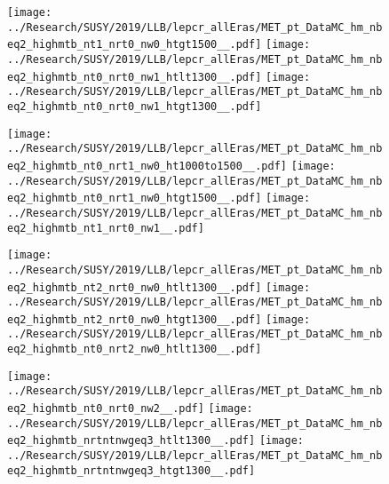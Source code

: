 \begin{figure}[!htb]
  \texttt{[image: ../Research/SUSY/2019/LLB/lepcr\_allEras/MET\_pt\_DataMC\_hm\_nbeq2\_highmtb\_nt1\_nrt0\_nw0\_htgt1500\_\_.pdf]}
\endminipage
{}
  \texttt{[image: ../Research/SUSY/2019/LLB/lepcr\_allEras/MET\_pt\_DataMC\_hm\_nbeq2\_highmtb\_nt0\_nrt0\_nw1\_htlt1300\_\_.pdf]}
\endminipage\hfill
{}
  \texttt{[image: ../Research/SUSY/2019/LLB/lepcr\_allEras/MET\_pt\_DataMC\_hm\_nbeq2\_highmtb\_nt0\_nrt0\_nw1\_htgt1300\_\_.pdf]}
\endminipage\hfill
\end{figure}

\begin{figure}[!htb]
  \texttt{[image: ../Research/SUSY/2019/LLB/lepcr\_allEras/MET\_pt\_DataMC\_hm\_nbeq2\_highmtb\_nt0\_nrt1\_nw0\_ht1000to1500\_\_.pdf]}
\endminipage\hfill
{}
  \texttt{[image: ../Research/SUSY/2019/LLB/lepcr\_allEras/MET\_pt\_DataMC\_hm\_nbeq2\_highmtb\_nt0\_nrt1\_nw0\_htgt1500\_\_.pdf]}
\endminipage\hfill
{}
  \texttt{[image: ../Research/SUSY/2019/LLB/lepcr\_allEras/MET\_pt\_DataMC\_hm\_nbeq2\_highmtb\_nt1\_nrt0\_nw1\_\_.pdf]}
\endminipage
\end{figure}

\begin{figure}[!htb]
  \texttt{[image: ../Research/SUSY/2019/LLB/lepcr\_allEras/MET\_pt\_DataMC\_hm\_nbeq2\_highmtb\_nt2\_nrt0\_nw0\_htlt1300\_\_.pdf]}
\endminipage\hfill
{}
  \texttt{[image: ../Research/SUSY/2019/LLB/lepcr\_allEras/MET\_pt\_DataMC\_hm\_nbeq2\_highmtb\_nt2\_nrt0\_nw0\_htgt1300\_\_.pdf]}
\endminipage\hfill
{}
  \texttt{[image: ../Research/SUSY/2019/LLB/lepcr\_allEras/MET\_pt\_DataMC\_hm\_nbeq2\_highmtb\_nt0\_nrt2\_nw0\_htlt1300\_\_.pdf]}
\endminipage
\end{figure}

\begin{figure}[!htb]
  \texttt{[image: ../Research/SUSY/2019/LLB/lepcr\_allEras/MET\_pt\_DataMC\_hm\_nbeq2\_highmtb\_nt0\_nrt0\_nw2\_\_.pdf]}
\endminipage\hfill
{}
  \texttt{[image: ../Research/SUSY/2019/LLB/lepcr\_allEras/MET\_pt\_DataMC\_hm\_nbeq2\_highmtb\_nrtntnwgeq3\_htlt1300\_\_.pdf]}
\endminipage\hfill
{}
  \texttt{[image: ../Research/SUSY/2019/LLB/lepcr\_allEras/MET\_pt\_DataMC\_hm\_nbeq2\_highmtb\_nrtntnwgeq3\_htgt1300\_\_.pdf]}
\endminipage
\end{figure}

